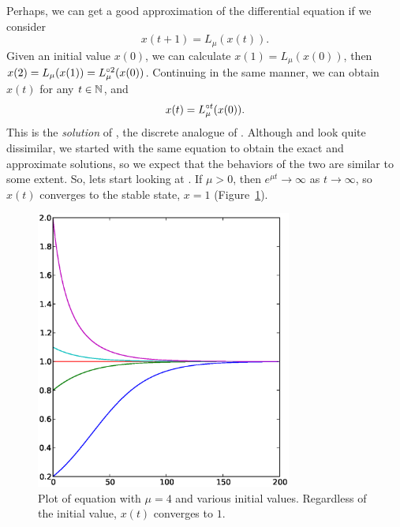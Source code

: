 \documentclass[12pt,twoside,draft]{book}
\begin{document}
Perhaps, we can get a good approximation of the differential equation if we consider
\begin{equation}
  x(t + 1) = L_{\mu}(x(t)).
  \label{eqn:logistic}
\end{equation}
Given an initial value $x(0)$, we can calculate $x(1) = L_\mu(x(0))$, then $x(2) = L_\mu(x(1)) = L_\mu^{\circ 2}(x(0))$.
Continuing in the same manner, we can obtain $x(t)$ for any $t \in \mathbb{N}$, and 
\begin{equation}
  x(t) = L_\mu^{\circ t}(x(0)).
  \label{eqn:logisticsoln}
\end{equation}
This is the \textit{solution} of , the discrete analogue of .
Although  and  look quite dissimilar, we started with the same equation to obtain the exact  and approximate  solutions, so we expect that the behaviors of the two are similar to some extent.
So, lets start looking at .
If $\mu > 0$, then $e^{\mu t} \to \infty$ as $t \to \infty$, so $x(t)$ converges to the stable state, $x = 1$ (Figure~\ref{fig:lde1}).
\begin{figure}[ht]
  \begin{center}
    \includegraphics[width=0.75\textwidth]{logistic_diffeq_mu4_varyingx0}
  \end{center}
  \caption{
    Plot of equation  with $\mu = 4$ and various initial values. 
  Regardless of the initial value, $x(t)$ converges to $1$.
}
  \label{fig:lde1}
\end{figure}
\end{document}
